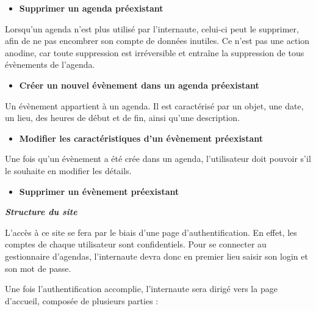 \documentclass[12pt , a4paper]{article}
\begin{document}
\begin{itemize}
\item \textbf{Supprimer un agenda pr\'eexistant}
\end{itemize}
Lorsqu{\textquoteright}un agenda n{\textquoteright}est plus utilis\'e
par l{\textquoteright}internaute, celui-ci peut le supprimer, afin de
ne pas encombrer son compte de donn\'ees inutiles. Ce
n{\textquoteright}est pas une action anodine, car toute suppression est
irr\'eversible et entra\^ine la suppression de tous \'ev\`enements de
l{\textquoteright}agenda.


\begin{itemize}
\item \textbf{Cr\'eer un nouvel \'ev\`enement dans un agenda
pr\'eexistant}
\end{itemize}
Un \'ev\`enement appartient \`a un agenda. Il est caract\'eris\'e par un
objet, une date, un lieu, des heures de d\'ebut et de fin, ainsi
qu{\textquoteright}une description.


\begin{itemize}
\item \textbf{Modifier les caract\'eristiques d{\textquoteright}un
\'ev\`enement pr\'eexistant}
\end{itemize}
Une fois qu{\textquoteright}un \'ev\`enement a \'et\'e cr\'ee dans un
agenda, l{\textquoteright}utilisateur doit pouvoir s{\textquoteright}il
le souhaite en modifier les d\'etails.


\begin{itemize}
\item \textbf{Supprimer un \'ev\`enement pr\'eexistant}
\end{itemize}






{\centering
\textbf{\textit{\textcolor[rgb]{0.0,0.4392157,0.7529412}{Structure du
site}}}
\par}







L{\textquoteright}acc\`es \`a ce site se fera par le biais
d{\textquoteright}une page d{\textquoteright}authentification. En
effet, les comptes de chaque utilisateur sont confidentiels. Pour se
connecter au gestionnaire d{\textquoteright}agendas,
l{\textquoteright}internaute devra donc en premier lieu saisir son
login et son mot de passe.




Une fois l{\textquoteright}authentification accomplie,
l{\textquoteright}internaute sera dirig\'e vers la page
d{\textquoteright}accueil, compos\'ee de plusieurs parties :
\end{document}

